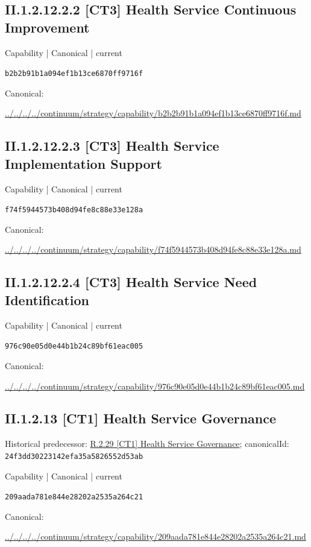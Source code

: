 \documentclass[10pt,a4paper]{article}
\begin{document}
\subsection*{II.1.2.12.2.2 [CT3] Health Service Continuous Improvement}
\label{element-b2b2b91b1a094ef1b13ce6870ff9716f}
{\small Capability | Canonical | current}\par
\texttt{b2b2b91b1a094ef1b13ce6870ff9716f}\par
Canonical: \par
{\footnotesize\url{../../../../continuum/strategy/capability/b2b2b91b1a094ef1b13ce6870ff9716f.md}}\par
\subsection*{II.1.2.12.2.3 [CT3] Health Service Implementation Support}
\label{element-f74f5944573b408d94fe8c88e33e128a}
{\small Capability | Canonical | current}\par
\texttt{f74f5944573b408d94fe8c88e33e128a}\par
Canonical: \par
{\footnotesize\url{../../../../continuum/strategy/capability/f74f5944573b408d94fe8c88e33e128a.md}}\par
\subsection*{II.1.2.12.2.4 [CT3] Health Service Need Identification}
\label{element-976c90e05d0e44b1b24c89bf61eac005}
{\small Capability | Canonical | current}\par
\texttt{976c90e05d0e44b1b24c89bf61eac005}\par
Canonical: \par
{\footnotesize\url{../../../../continuum/strategy/capability/976c90e05d0e44b1b24c89bf61eac005.md}}\par
\subsection*{II.1.2.13 [CT1] Health Service Governance}
Historical predecessor: \hyperref[element-24f3dd30223142efa35a5826552d53ab]{R.2.29 [CT1] Health Service Governance}; canonicalId: \texttt{24f3dd30223142efa35a5826552d53ab}\par
\label{element-209aada781e844e28202a2535a264c21}
{\small Capability | Canonical | current}\par
\texttt{209aada781e844e28202a2535a264c21}\par
Canonical: \par
{\footnotesize\url{../../../../continuum/strategy/capability/209aada781e844e28202a2535a264c21.md}}\par
\end{document}
